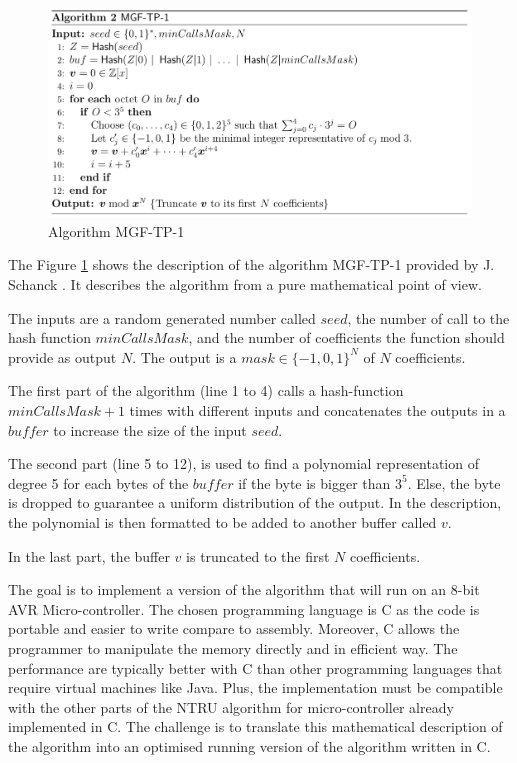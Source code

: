 \begin{figure}[h]
  \includegraphics[width=\textwidth]{img/mgf1-description.png}
  \caption{Algorithm MGF-TP-1 \cite{schanck_practical_2015} }
  \label{fig:mgf-1}
\end{figure}

The Figure \ref{fig:mgf-1} shows the description of the algorithm MGF-TP-1 provided by J. Schanck \cite{schanck_practical_2015}. It describes the algorithm from a pure mathematical point of view. 

The inputs are a random generated number called $seed$, the number of call to the hash function $minCallsMask$, and the number of coefficients the function should provide as output $N$. The output is a $mask \in \{-1,0,1\}^N$ of $N$ coefficients.

The first part of the algorithm (line 1 to 4) calls a hash-function  $minCallsMask + 1$ times with different inputs and concatenates the outputs in a $buffer$ to increase the size of the input $seed$.

The second part (line 5 to 12), is used to find a polynomial representation of degree 5 for each bytes of the $buffer$ if the byte is bigger than $3^5$. Else, the byte is dropped to guarantee a uniform distribution of the output. In the description, the polynomial is then formatted to be added to another buffer called $v$.

In the last part, the buffer $v$ is truncated to the first $N$ coefficients.

The goal is to implement a version of the algorithm that will run on an 8-bit AVR Micro-controller. The chosen programming language is C as the code is portable and easier to write compare to assembly. Moreover, C allows the programmer to manipulate the memory directly and in efficient way. The performance are typically better with C than other programming languages that require virtual machines like Java. Plus, the implementation must be compatible with the other parts of the NTRU algorithm for micro-controller already implemented in C.
The challenge is to translate this mathematical description of the algorithm into an optimised running version of the algorithm written in C.


